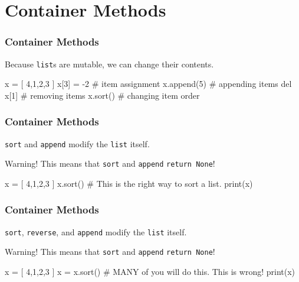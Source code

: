 \documentclass[11pt]{beamer}
\begin{document}
\section{Container Methods}

\begin{frame}[fragile]
  \frametitle{Container Methods}
  \Enlarge

  \begin{itemize}
  \myitem  Because \texttt{list}s are mutable, we can change their contents.
  \end{itemize}
  \begin{semiverbatim}
x = [ 4,1,2,3 ]
x[3] = -2       # item assignment
x.append(5)     # appending items
del x[1]        # removing items
x.sort()        # changing item order
  \end{semiverbatim}
\end{frame}

\begin{frame}[fragile]
  \frametitle{Container Methods}
  \Enlarge

  \begin{itemize}
  \myitem  \texttt{sort} and \texttt{append} modify the \texttt{list} itself.
  \end{itemize}
  \begin{alertblock}{Warning!}
  This means that \texttt{sort} and \texttt{append} \texttt{return None}!
  \end{alertblock}
  \begin{semiverbatim}
x = [ 4,1,2,3 ]
x.sort()        # This is the right way to sort a list.
print(x)
  \end{semiverbatim}
\end{frame}

\begin{frame}[fragile]
  \frametitle{Container Methods}
  \Enlarge

  \begin{itemize}
  \myitem  \texttt{sort}, \texttt{reverse}, and \texttt{append} modify the \texttt{list} itself.
  \end{itemize}
  \begin{alertblock}{Warning!}
  This means that \texttt{sort} and \texttt{append} \texttt{return None}!
  \end{alertblock}
  \begin{semiverbatim}
x = [ 4,1,2,3 ]
x = x.sort()    # MANY of you will do this.  This is wrong!
print(x)
  \end{semiverbatim}
\end{frame}
\end{document}

